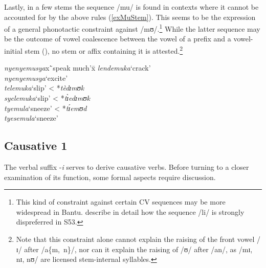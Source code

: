 Lastly, in a few stems the sequence /mu/ is found in contexts where it cannot be accounted for by the above rules (\ref{exMuStem}). This seems to be the expression of a general phonotactic constraint against /mʊ/.\footnote{This kind of constraint against certain CV sequences may be more widespread in Bantu. \citet{BennettWGLeeSJ2015} describe in detail how the sequence /li/ is strongly dispreferred in  S53.} While the latter sequence may be the outcome of vowel coalescence between the vowel of a prefix and a vowel-initial stem (), no stem or affix containing it is attested.\footnote{Note that this constraint alone cannot explain the raising of the front vowel /ɪ/ after \mbox{/a\{m, n\}/}, nor can it explain the raising of /ʊ/ after /an/, as /mɪ, nɪ, nʊ/ are licensed stem-internal syllables.}

\begin{exe}
\ex \label{exMuStem}
\begin{tabbing}
\textit{nyenyemusya}x\=`speak much'x\=\kill
\textit{lendemuka}\>`crack'
\\\textit{nyenyemusya}\>`excite'
\\\textit{telemuka}\>`slip'\> < *\textit{tèdɪmʊk} 
\\\textit{syelemuka}\>`slip'\> < *\textit{tɪ̀edɪmʊk}
\\\textit{tyemula}\>`sneeze'\> < *\textit{tɪ́emʊd}
\\\textit{tyesemula}\>`sneeze'
\end{tabbing}
\end{exe}

\subsection{Causative 1} \label{Causative1} 
The verbal suffix -\textit{i} serves to derive causative verbs. Before turning to a closer examination of its function, some formal aspects require discussion.

